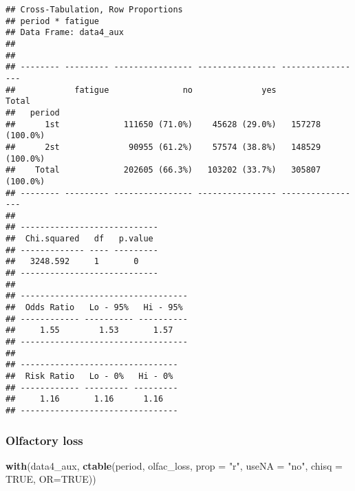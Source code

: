 \documentclass[
]{article}
\newenvironment{Shaded}{\begin{snugshade}}{\end{snugshade}}
\newcommand{\DataTypeTok}[1]{\textcolor[rgb]{0.13,0.29,0.53}{#1}}
\newcommand{\KeywordTok}[1]{\textcolor[rgb]{0.13,0.29,0.53}{\textbf{#1}}}
\newcommand{\NormalTok}[1]{#1}
\newcommand{\OtherTok}[1]{\textcolor[rgb]{0.56,0.35,0.01}{#1}}
\newcommand{\StringTok}[1]{\textcolor[rgb]{0.31,0.60,0.02}{#1}}
\begin{document}
\begin{verbatim}
## Cross-Tabulation, Row Proportions  
## period * fatigue  
## Data Frame: data4_aux  
## 
## 
## -------- --------- ---------------- ---------------- -----------------
##            fatigue               no              yes             Total
##   period                                                              
##      1st             111650 (71.0%)    45628 (29.0%)   157278 (100.0%)
##      2st              90955 (61.2%)    57574 (38.8%)   148529 (100.0%)
##    Total             202605 (66.3%)   103202 (33.7%)   305807 (100.0%)
## -------- --------- ---------------- ---------------- -----------------
## 
## ----------------------------
##  Chi.squared   df   p.value 
## ------------- ---- ---------
##   3248.592     1       0    
## ----------------------------
## 
## ----------------------------------
##  Odds Ratio   Lo - 95%   Hi - 95% 
## ------------ ---------- ----------
##     1.55        1.53       1.57   
## ----------------------------------
## 
## --------------------------------
##  Risk Ratio   Lo - 0%   Hi - 0% 
## ------------ --------- ---------
##     1.16       1.16      1.16   
## --------------------------------
\end{verbatim}

\hypertarget{olfactory-loss-1}{%
\subsubsection{Olfactory loss}\label{olfactory-loss-1}}

\begin{Shaded}
\begin{Highlighting}[]
\KeywordTok{with}\NormalTok{(data4_aux, }\KeywordTok{ctable}\NormalTok{(period, olfac_loss, }\DataTypeTok{prop =} \StringTok{"r"}\NormalTok{, }\DataTypeTok{useNA =} \StringTok{"no"}\NormalTok{, }\DataTypeTok{chisq =} \OtherTok{TRUE}\NormalTok{, }\DataTypeTok{OR=}\OtherTok{TRUE}\NormalTok{))}
\end{Highlighting}
\end{Shaded}
\end{document}

